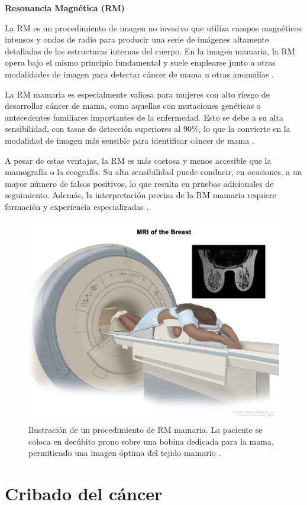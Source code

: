 \documentclass[a4paper,10pt]{book}
\begin{document}
\textbf{Resonancia Magnética (RM)}

La RM es un procedimiento de imagen no invasivo que utiliza campos magnéticos intensos y ondas de radio para producir una serie de imágenes altamente detalladas de las estructuras internas del cuerpo. En la imagen mamaria, la RM opera bajo el mismo principio fundamental y suele emplearse junto a otras modalidades de imagen para detectar cáncer de mama u otras anomalías \cite{nih_definition_2011}.

La RM mamaria es especialmente valiosa para mujeres con alto riesgo de desarrollar cáncer de mama, como aquellas con mutaciones genéticas o antecedentes familiares importantes de la enfermedad. Esto se debe a su alta sensibilidad, con tasas de detección superiores al 90\%, lo que la convierte en la modalidad de imagen más sensible para identificar cáncer de mama \cite{radswiki_breast_nodate}.

A pesar de estas ventajas, la RM es más costosa y menos accesible que la mamografía o la ecografía. Su alta sensibilidad puede conducir, en ocasiones, a un mayor número de falsos positivos, lo que resulta en pruebas adicionales de seguimiento. Además, la interpretación precisa de la RM mamaria requiere formación y experiencia especializadas \cite{noauthor_technical_nodate}.

\begin{figure}
    \centering
    \includegraphics[width=0.5\linewidth]{reports//assets/breast_mri.jpg}
    \caption[Procedimiento de RM mamaria]{Ilustración de un procedimiento de RM mamaria. La paciente se coloca en decúbito prono sobre una bobina dedicada para la mama, permitiendo una imagen óptima del tejido mamario \cite{nih_definition_2011}.}
    \label{fig:breast_mri}
\end{figure}

\section{Cribado del cáncer}
\end{document}
